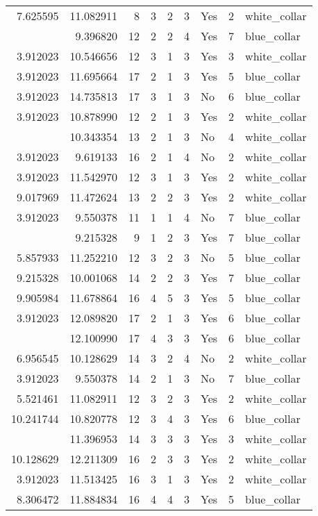 \documentclass[
]{article}
\begin{document}
\begin{longtable}[t]{rrrrrllrl}
7.625595 & 11.082911 & 8 & 3 & 2 & 3 & Yes & 2 & white\_collar\\
\addlinespace
8.055158 & 9.396820 & 12 & 2 & 2 & 4 & Yes & 7 & blue\_collar\\
3.912023 & 10.546656 & 12 & 3 & 1 & 3 & Yes & 3 & white\_collar\\
3.912023 & 11.695664 & 17 & 2 & 1 & 3 & Yes & 5 & blue\_collar\\
3.912023 & 14.735813 & 17 & 3 & 1 & 3 & No & 6 & blue\_collar\\
3.912023 & 10.878990 & 12 & 2 & 1 & 3 & Yes & 2 & white\_collar\\
\addlinespace
3.912023 & 10.343354 & 13 & 2 & 1 & 3 & No & 4 & white\_collar\\
3.912023 & 9.619133 & 16 & 2 & 1 & 4 & No & 2 & white\_collar\\
3.912023 & 11.542970 & 12 & 3 & 1 & 3 & Yes & 2 & white\_collar\\
9.017969 & 11.472624 & 13 & 2 & 2 & 3 & Yes & 2 & white\_collar\\
3.912023 & 9.550378 & 11 & 1 & 1 & 4 & No & 7 & blue\_collar\\
\addlinespace
6.956545 & 9.215328 & 9 & 1 & 2 & 3 & Yes & 7 & blue\_collar\\
5.857933 & 11.252210 & 12 & 3 & 2 & 3 & No & 5 & blue\_collar\\
9.215328 & 10.001068 & 14 & 2 & 2 & 3 & Yes & 7 & blue\_collar\\
9.905984 & 11.678864 & 16 & 4 & 5 & 3 & Yes & 5 & blue\_collar\\
3.912023 & 12.089820 & 17 & 2 & 1 & 3 & Yes & 6 & blue\_collar\\
\addlinespace
6.109248 & 12.100990 & 17 & 4 & 3 & 3 & Yes & 6 & blue\_collar\\
6.956545 & 10.128629 & 14 & 3 & 2 & 4 & No & 2 & white\_collar\\
3.912023 & 9.550378 & 14 & 2 & 1 & 3 & No & 7 & blue\_collar\\
5.521461 & 11.082911 & 12 & 3 & 2 & 3 & Yes & 2 & white\_collar\\
10.241744 & 10.820778 & 12 & 3 & 4 & 3 & Yes & 6 & blue\_collar\\
\addlinespace
9.619133 & 11.396953 & 14 & 3 & 3 & 3 & Yes & 3 & white\_collar\\
10.128629 & 12.211309 & 16 & 2 & 3 & 3 & Yes & 2 & white\_collar\\
3.912023 & 11.513425 & 16 & 3 & 1 & 3 & Yes & 2 & white\_collar\\
8.306472 & 11.884834 & 16 & 4 & 4 & 3 & Yes & 5 & blue\_collar\\

\end{longtable}
\end{document}
